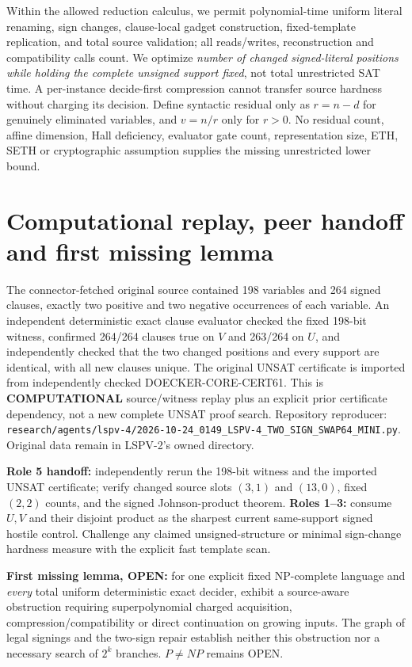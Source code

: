 \documentclass[11pt]{article}
\begin{document}
\normalsize
Within the allowed reduction calculus, we permit polynomial-time uniform literal renaming, sign changes, clause-local gadget construction, fixed-template replication, and total source validation; all reads/writes, reconstruction and compatibility calls count. We optimize \emph{number of changed signed-literal positions while holding the complete unsigned support fixed}, not total unrestricted SAT time. A per-instance decide-first compression cannot transfer source hardness without charging its decision. Define syntactic residual only as $r=n-d$ for genuinely eliminated variables, and $v=n/r$ only for $r>0$. No residual count, affine dimension, Hall deficiency, evaluator gate count, representation size, ETH, SETH or cryptographic assumption supplies the missing unrestricted lower bound.

\section{Computational replay, peer handoff and first missing lemma}
The connector-fetched original source contained 198 variables and 264 signed clauses, exactly two positive and two negative occurrences of each variable. An independent deterministic exact clause evaluator checked the fixed 198-bit witness, confirmed 264/264 clauses true on $V$ and 263/264 on $U$, and independently checked that the two changed positions and every support are identical, with all new clauses unique. The original UNSAT certificate is imported from independently checked DOECKER-CORE-CERT61. This is \textbf{COMPUTATIONAL} source/witness replay plus an explicit prior certificate dependency, not a new complete UNSAT proof search.
Repository reproducer: \texttt{research/agents/lspv-4/2026-10-24\_0149\_LSPV-4\_TWO\_SIGN\_SWAP64\_MINI.py}. Original data remain in LSPV-2's owned directory.

\noindent\textbf{Role 5 handoff:} independently rerun the 198-bit witness and the imported UNSAT certificate; verify changed source slots $(3,1)$ and $(13,0)$, fixed $(2,2)$ counts, and the signed Johnson-product theorem. \textbf{Roles 1--3:} consume $U,V$ and their disjoint product as the sharpest current same-support signed hostile control. Challenge any claimed unsigned-structure or minimal sign-change hardness measure with the explicit fast template scan.

\noindent\textbf{First missing lemma, OPEN:} for one explicit fixed NP-complete language and \emph{every} total uniform deterministic exact decider, exhibit a source-aware obstruction requiring superpolynomial charged acquisition, compression/compatibility or direct continuation on growing inputs. The graph of legal signings and the two-sign repair establish neither this obstruction nor a necessary search of $2^k$ branches. $P\ne NP$ remains OPEN.
\end{document}

